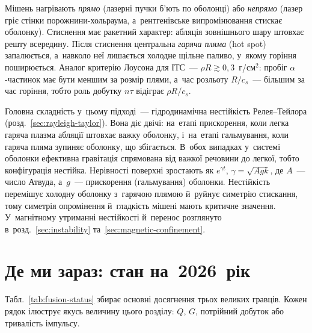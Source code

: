 Мішень нагрівають \emph{прямо} (лазерні пучки б'ють по оболонці) або \emph{непрямо}
(лазер гріє стінки порожнини-хольраума, а~рентгенівське випромінювання стискає оболонку).
Стиснення має ракетний характер: абляція зовнішнього шару штовхає решту всередину.
Після стиснення центральна \emph{гаряча пляма} (hot spot) запалюється, а~навколо неї лишається
холодне щільне паливо, у~якому горіння поширюється. Аналог критерію Лоусона для ІТС~---
$\rho R\gtrsim0{,}3$~г/см$^2$: пробіг $\alpha$-частинок має бути меншим за розмір плями, а~час
розльоту $R/c_s$~--- більшим за час горіння, тобто роль добутку $n\tau$ відіграє $\rho R/c_s$.

Головна складність у~цьому підході~--- гідродинамічна нестійкість Релея--Тейлора
(розд.~\ref{sec:rayleigh-taylor}). Вона діє двічі: на~етапі прискорення, коли легка гаряча
плазма абляції штовхає важку оболонку, і~на~етапі гальмування, коли гаряча пляма зупиняє
оболонку, що збігається. В~обох випадках у~системі оболонки ефективна гравітація спрямована
від важкої речовини до легкої, тобто конфігурація нестійка. Нерівності поверхні зростають як
$e^{\gamma t}$, $\gamma=\sqrt{Agk}$, де $A$~--- число Атвуда, а~$g$~--- прискорення
(гальмування) оболонки. Нестійкість перемішує холодну оболонку з~гарячою плямою й~руйнує
симетрію стискання, тому симетрія опромінення й~гладкість мішені мають критичне значення. У~магнітному утриманні нестійкості й~перенос
розглянуто в~розд.~\ref{sec:instability} та~\ref{sec:magnetic-confinement}.

\section{Де ми зараз: стан на~2026~рік}\label{sec:fusion-status}

Табл.~\ref{tab:fusion-status} збирає основні досягнення трьох великих гравців. Кожен рядок
ілюструє якусь величину цього розділу: $Q$, $G$, потрійний добуток або тривалість імпульсу.

